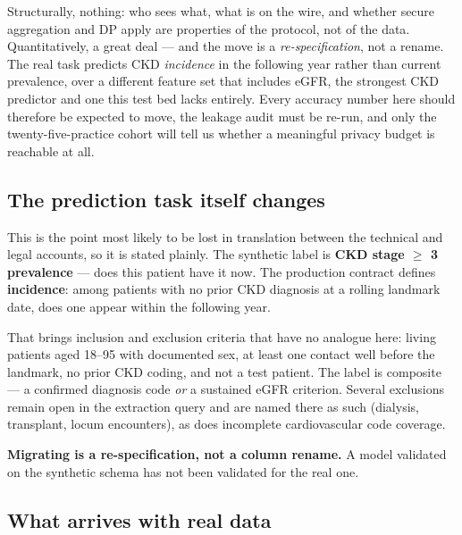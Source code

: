 \label{sec:realdata}
\statusMeasured

\begin{shortanswer}
Structurally, nothing: who sees what, what is on the wire, and whether secure aggregation and DP
apply are properties of the protocol, not of the data. Quantitatively, a great deal --- and the move
is a \emph{re-specification}, not a rename. The real task predicts CKD \emph{incidence} in the
following year rather than current prevalence, over a different feature set that includes eGFR, the
strongest CKD predictor and one this test bed lacks entirely. Every accuracy number here should
therefore be expected to move, the leakage audit must be re-run, and only the twenty-five-practice
cohort will tell us whether a meaningful privacy budget is reachable at all.
\end{shortanswer}

\subsection{The prediction task itself changes}

This is the point most likely to be lost in translation between the technical and legal accounts, so
it is stated plainly. The synthetic label is \textbf{CKD stage $\ge$ 3 prevalence} --- does this
patient have it now. The production contract defines \textbf{incidence}: among patients with no
prior CKD diagnosis at a rolling landmark date, does one appear within the following year.

That brings inclusion and exclusion criteria that have no analogue here: living patients aged
18--95 with documented sex, at least one contact well before the landmark, no prior CKD coding, and
not a test patient. The label is composite --- a confirmed diagnosis code \emph{or} a sustained
eGFR criterion. Several exclusions remain open in the extraction query and are named there as such
(dialysis, transplant, locum encounters), as does incomplete cardiovascular code coverage.

\textbf{Migrating is a re-specification, not a column rename.} A model validated on the synthetic
schema has not been validated for the real one.

\subsection{What arrives with real data}


